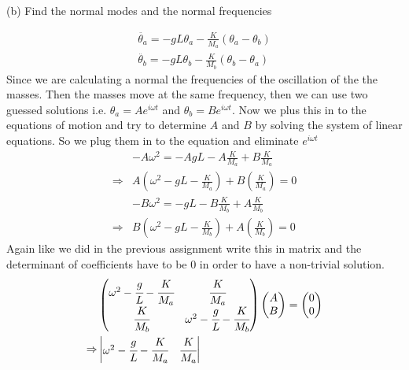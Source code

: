 \documentclass[addpoints]{exam}
\begin{document}
\begin{questions}
(b) Find the normal modes and the normal frequencies
\begin{solution}
   \begin{align*}
        \ddot{\theta_a} = -{g}{L}\theta_a - \frac{K}{M_a}(\theta_a-\theta_b)\\
        \ddot{\theta_b} = -{g}{L}\theta_b - \frac{K}{M_b}(\theta_b-\theta_a)
   \end{align*} 
   Since we are calculating a normal the frequencies of the oscillation of the the masses. Then the masses move at the same frequency, then we can use two guessed solutions i.e.
   $\theta_a = Ae^{i\omega t}$ and $\theta_b = B e^{i\omega t}$. Now we plus this in to the equations of motion and try to determine $A$ and $B$ by solving the system of linear 
   equations. So we plug them in to the equation and eliminate $e^{i\omega t}$
   \begin{align*}
       \tag{for mass $M_a$}
        &-A\omega^2 = -A{g}{L}- A\frac{K}{M_a}+B\frac{K}{M_a}\\
        \Rightarrow&A\left(\omega^2 -{g}{L}- \frac{K}{M_a}\right)+B\left(\frac{K}{M_a}\right) = 0\\
        \tag{for mass $M_b$} 
        &-B\omega^2 = -{g}{L}- B\frac{K}{M_b} +A\frac{K}{M_b}\\
        \Rightarrow&B\left(\omega^2 -{g}{L}- \frac{K}{M_b}\right)+A\left(\frac{K}{M_b}\right) = 0
   \end{align*} 
   Again like we did in the previous assignment write this in matrix and the determinant of coefficients have to be 0 in order to have a non-trivial solution.
   \begin{align*}
        &\begin{pmatrix}
            \omega ^{2} -\cfrac{g}{L} -\cfrac{K}{M_{a}} & \cfrac{K}{M_{a}}\\
            \cfrac{K}{M_{b}} & \omega ^{2} -\cfrac{g}{L} -\cfrac{K}{M_{b}}
            \end{pmatrix}\begin{pmatrix}
            A\\
            B
            \end{pmatrix} =\begin{pmatrix}
            0\\
            0
            \end{pmatrix}\\ 
        \Rightarrow& 
        \begin{vmatrix}
            \omega ^{2} -\cfrac{g}{L} -\cfrac{K}{M_{a}} & \cfrac{K}{M_{a}}\\

\end{vmatrix}
\end{align*}
\end{solution}
\end{questions}
\end{document}
